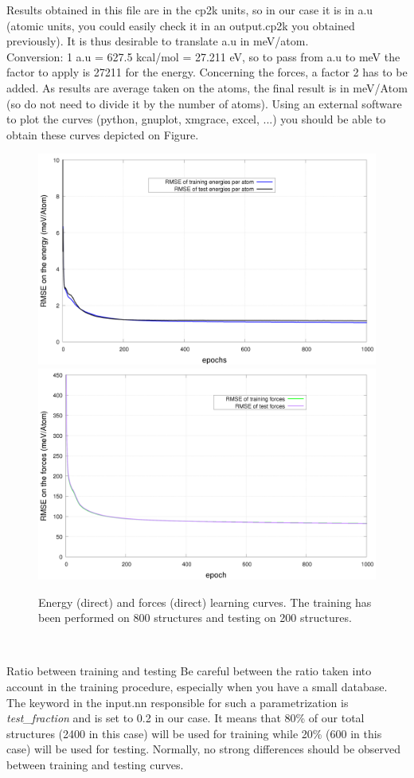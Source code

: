 \documentclass[12pt]{article}
\newcommand\Warning{%
 \makebox[1.4em][c]{%
 \makebox[0pt][c]{\raisebox{.1em}{\small!}}%
 \makebox[0pt][c]{\color{red}\Large$\bigtriangleup$}}}%
\begin{document}
Results obtained in this file are in the cp2k units, so in our case it is in a.u (atomic units, you could easily check it in an output.cp2k you obtained previously). It is thus desirable to translate a.u in meV/atom. \\
Conversion: 1 a.u = 627.5 kcal/mol = 27.211 eV, so to pass from a.u to meV the factor to apply is 27211 for the energy. Concerning the forces, a factor 2 has to be added. As results are average taken on the atoms, the final result is in meV/Atom (so do not need to divide it by the number of atoms). Using an external software to plot the curves (python, gnuplot, xmgrace, excel, ...) you should be able to obtain these curves depicted on Figure. 
\begin{figure}
    \centering
    \includegraphics[scale=0.2]{energy.png}
    \includegraphics[scale=0.2]{forces.png}
    \caption{Energy (direct) and forces (direct) learning curves. The training has been performed on 800 structures and testing on 200 structures.}
    \label{fig:my_label}
\end{figure}
\\
\begin{mybox1}{Ratio between training and testing}
\Warning Be careful between the ratio taken into account in the training procedure, especially when you have a small database. The keyword in the input.nn responsible for such a parametrization is \textit{test\_fraction} and is set to 0.2 in our case. It means that 80\% of our total structures (2400 in this case) will be used for training while 20\% (600 in this case) will be used for testing. Normally, no strong differences should be observed between training and testing curves.  
\end{mybox1}
\end{document}
